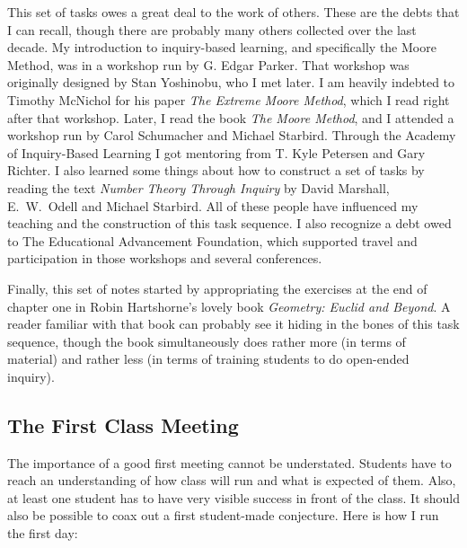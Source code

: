 \documentclass{tufte-handout}
\theoremstyle{definition}
\begin{document}
This set of tasks owes a great deal to the work of others. These are the debts that I can recall, though there are probably many others collected over the last decade.
My introduction to inquiry-based learning, and specifically the Moore Method, was in a workshop run by G. Edgar Parker. That workshop was originally designed by Stan Yoshinobu, who I met later. I am heavily indebted to Timothy McNichol for his paper \emph{The Extreme Moore Method}\cite{mcnichol}, which I read right after that workshop. Later, I read the book \emph{The Moore Method}\cite{cmmp}, and I attended a workshop run by Carol Schumacher and Michael Starbird. Through the Academy of Inquiry-Based Learning I got mentoring from T. Kyle Petersen and Gary Richter. I also learned some things about how to construct a set of tasks by reading the text
\emph{Number Theory Through Inquiry}\cite{nothy} by David Marshall, E.~W.~Odell and Michael Starbird.
All of these people have influenced my teaching and the construction of this task sequence. I also recognize a debt owed to The Educational Advancement Foundation, which supported travel and participation in those workshops and several conferences.

Finally, this set of notes started by appropriating the exercises at the end of chapter one in Robin Hartshorne's lovely book \emph{Geometry: Euclid and Beyond}\cite{hartshorne}. A reader familiar with that book can probably see it hiding in the bones of this task sequence, though the book simultaneously does rather more (in terms of material) and rather less (in terms of training students to do open-ended inquiry).


\subsection{The First Class Meeting}

The importance of a good first meeting cannot be understated.
Students have to reach an understanding of how class will run and what is expected of them.
Also, at least one student has to have very visible success in front of the class.
It should also be possible to coax out a first student-made conjecture.
Here is how I run the first day:\\[.1in]
\end{document}
